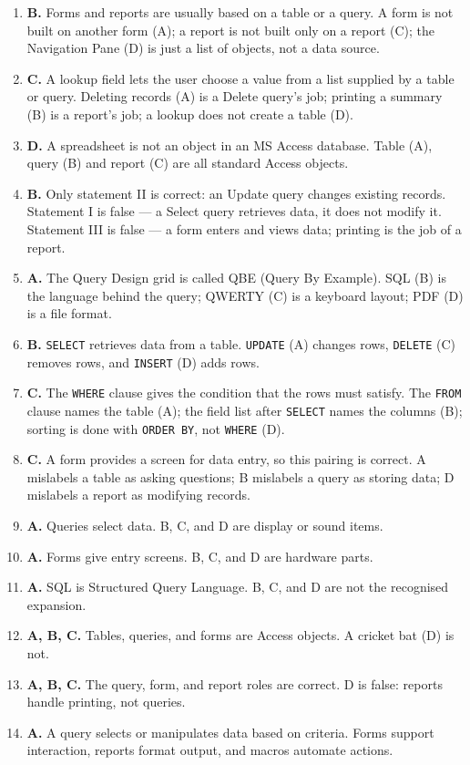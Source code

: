 \begin{enumerate}[label=\textbf{Q\arabic*.}, leftmargin=*]
  and D scramble this order.
\item \textbf{B.} Forms and reports are usually based on a table or a query.
  A form is not built on another form (A); a report is not built only on a
  report (C); the Navigation Pane (D) is just a list of objects, not a data
  source.
\item \textbf{C.} A lookup field lets the user choose a value from a list
  supplied by a table or query. Deleting records (A) is a Delete query's job;
  printing a summary (B) is a report's job; a lookup does not create a table
  (D).
\item \textbf{D.} A spreadsheet is not an object in an MS Access database.
  Table (A), query (B) and report (C) are all standard Access objects.
\item \textbf{B.} Only statement II is correct: an Update query changes
  existing records. Statement I is false --- a Select query retrieves data,
  it does not modify it. Statement III is false --- a form enters and views
  data; printing is the job of a report.
\item \textbf{A.} The Query Design grid is called QBE (Query By Example).
  SQL (B) is the language behind the query; QWERTY (C) is a keyboard layout;
  PDF (D) is a file format.
\item \textbf{B.} \texttt{SELECT} retrieves data from a table. \texttt{UPDATE}
  (A) changes rows, \texttt{DELETE} (C) removes rows, and \texttt{INSERT}
  (D) adds rows.
\item \textbf{C.} The \texttt{WHERE} clause gives the condition that the
  rows must satisfy. The \texttt{FROM} clause names the table (A); the field
  list after \texttt{SELECT} names the columns (B); sorting is done with
  \texttt{ORDER BY}, not \texttt{WHERE} (D).
\item \textbf{C.} A form provides a screen for data entry, so this pairing is
  correct. A mislabels a table as asking questions; B mislabels a query as
  storing data; D mislabels a report as modifying records.

\item \textbf{A.} Queries select data. B, C, and D are display or sound items.
\item \textbf{A.} Forms give entry screens. B, C, and D are hardware parts.
\item \textbf{A.} SQL is Structured Query Language. B, C, and D are not the recognised expansion.
\item \textbf{A, B, C.} Tables, queries, and forms are Access objects. A cricket bat (D) is not.
\item \textbf{A, B, C.} The query, form, and report roles are correct. D is false: reports handle printing, not queries.
\item \textbf{A.} A query selects or manipulates data based on criteria. Forms support interaction, reports format output, and macros automate actions.


\end{enumerate}
